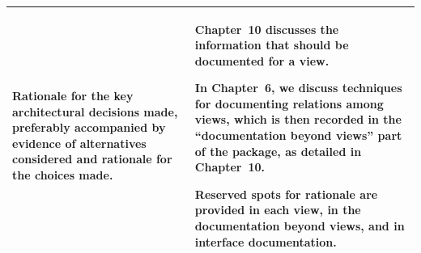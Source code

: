 \documentclass[11pt]{article}
\begin{document}
\begin{tabularx}{\textwidth}{@{}%
  >{\raggedright\arraybackslash}p{}%
  >{\raggedright\arraybackslash}p{}@{}}
Rationale for the key architectural decisions made, preferably accompanied by
evidence of alternatives considered and rationale for the choices made. &
Chapter~10 discusses the information that should be documented for a view.

In Chapter~6, we discuss techniques for documenting relations among views,
which is then recorded in the ``documentation beyond views'' part of the
package, as detailed in Chapter~10.

Reserved spots for rationale are provided in each view, in the documentation
beyond views, and in interface documentation. \\
\bottomrule
\end{tabularx}
\end{document}
